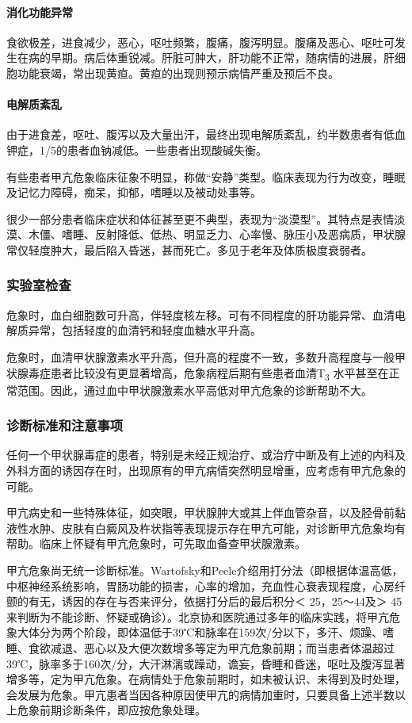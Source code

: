 \paragraph{消化功能异常}

食欲极差，进食减少，恶心，呕吐频繁，腹痛，腹泻明显。腹痛及恶心、呕吐可发生在病的早期。病后体重锐减。肝脏可肿大，肝功能不正常，随病情的进展，肝细胞功能衰竭，常出现黄疸。黄疸的出现则预示病情严重及预后不良。

\paragraph{电解质紊乱}

由于进食差，呕吐、腹泻以及大量出汗，最终出现电解质紊乱，约半数患者有低血钾症，1/5的患者血钠减低。一些患者出现酸碱失衡。

有些患者甲亢危象临床征象不明显，称做“安静”类型。临床表现为行为改变，睡眠及记忆力障碍，痴呆，抑郁，嗜睡以及被动处事等。

很少一部分患者临床症状和体征甚至更不典型，表现为“淡漠型”。其特点是表情淡漠、木僵、嗜睡、反射降低、低热、明显乏力、心率慢、脉压小及恶病质，甲状腺常仅轻度肿大，最后陷入昏迷，甚而死亡。多见于老年及体质极度衰弱者。

\subsubsection{实验室检查}

危象时，血白细胞数可升高，伴轻度核左移。可有不同程度的肝功能异常、血清电解质异常，包括轻度的血清钙和轻度血糖水平升高。

危象时，血清甲状腺激素水平升高，但升高的程度不一致，多数升高程度与一般甲状腺毒症患者比较没有更显著增高，危象病程后期有些患者血清T\textsubscript{3}
水平甚至在正常范围。因此，通过血中甲状腺激素水平高低对甲亢危象的诊断帮助不大。

\subsubsection{诊断标准和注意事项}

任何一个甲状腺毒症的患者，特别是未经正规治疗、或治疗中断及有上述的内科及外科方面的诱因存在时，出现原有的甲亢病情突然明显增重，应考虑有甲亢危象的可能。

甲亢病史和一些特殊体征，如突眼，甲状腺肿大或其上伴血管杂音，以及胫骨前黏液性水肿、皮肤有白癜风及杵状指等表现提示存在甲亢可能，对诊断甲亢危象均有帮助。临床上怀疑有甲亢危象时，可先取血备查甲状腺激素。

甲亢危象尚无统一诊断标准。Wartofsky和Peele介绍用打分法（即根据体温高低，中枢神经系统影响，胃肠功能的损害，心率的增加，充血性心衰表现程度，心房纤颤的有无，诱因的存在与否来评分，依据打分后的最后积分＜
25，25～44及＞
45来判断为不能诊断、怀疑或确诊）。北京协和医院通过多年的临床实践，将甲亢危象大体分为两个阶段，即体温低于39℃和脉率在159次/分以下，多汗、烦躁、嗜睡、食欲减退、恶心以及大便次数增多等定为甲亢危象前期；而当患者体温超过39℃，脉率多于160次/分，大汗淋漓或躁动，谵妄，昏睡和昏迷，呕吐及腹泻显著增多等，定为甲亢危象。在病情处于危象前期时，如未被认识、未得到及时处理，会发展为危象。甲亢患者当因各种原因使甲亢的病情加重时，只要具备上述半数以上危象前期诊断条件，即应按危象处理。

